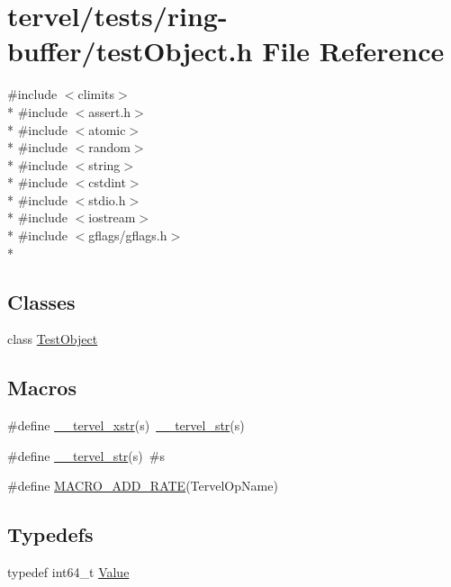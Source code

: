 \hypertarget{ring-buffer_2test_object_8h}{}\section{tervel/tests/ring-\/buffer/test\+Object.h File Reference}
\label{ring-buffer_2test_object_8h}
{\ttfamily \#include $<$climits$>$}\\*
{\ttfamily \#include $<$assert.\+h$>$}\\*
{\ttfamily \#include $<$atomic$>$}\\*
{\ttfamily \#include $<$random$>$}\\*
{\ttfamily \#include $<$string$>$}\\*
{\ttfamily \#include $<$cstdint$>$}\\*
{\ttfamily \#include $<$stdio.\+h$>$}\\*
{\ttfamily \#include $<$iostream$>$}\\*
{\ttfamily \#include $<$gflags/gflags.\+h$>$}\\*
\subsection*{Classes}
\begin{DoxyCompactItemize}
\item 
class \hyperlink{class_test_object}{Test\+Object}
\end{DoxyCompactItemize}
\subsection*{Macros}
\begin{DoxyCompactItemize}
\item 
\#define \hyperlink{ring-buffer_2test_object_8h_a26c845e049b4c24b4872ccf337d43a7c}{\+\_\+\+\_\+tervel\+\_\+xstr}(s)~\hyperlink{ring-buffer_2test_object_8h_ac822e06242113e5bf9fbf48d98055599}{\+\_\+\+\_\+tervel\+\_\+str}(s)
\item 
\#define \hyperlink{ring-buffer_2test_object_8h_ac822e06242113e5bf9fbf48d98055599}{\+\_\+\+\_\+tervel\+\_\+str}(s)~\#s
\item 
\#define \hyperlink{ring-buffer_2test_object_8h_ad024fc3e2980c9fff2efb715898272f1}{M\+A\+C\+R\+O\+\_\+\+A\+D\+D\+\_\+\+R\+A\+T\+E}(Tervel\+Op\+Name)
\end{DoxyCompactItemize}
\subsection*{Typedefs}
\begin{DoxyCompactItemize}
\item 
typedef int64\+\_\+t \hyperlink{ring-buffer_2test_object_8h_a772d89229af3552d6234f2c36857ce4f}{Value}
\end{DoxyCompactItemize}
